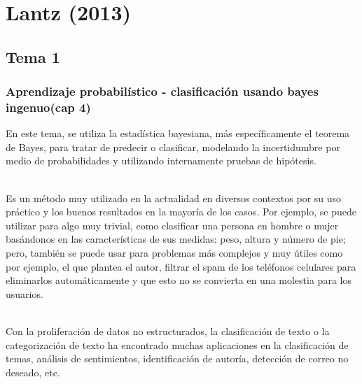 \documentclass[10pt]{beamer}
\begin{document}
\section{Lantz (2013)}
\subsection{Tema 1}
\begin{frame}
\frametitle{Aprendizaje probabilístico - clasificación usando bayes ingenuo(cap 4)}
En este tema, se utiliza la estadística bayesiana, más específicamente el teorema de Bayes, para tratar de predecir o clasificar, modelando la incertidumbre por medio de probabilidades y utilizando internamente pruebas de hipótesis. 

~\\Es un método muy utilizado en la actualidad en diversos contextos por su uso práctico y los buenos resultados en la mayoría de los casos. Por ejemplo, se puede utilizar para algo muy trivial, como clasificar una persona en hombre o mujer basándonos en las características de sus medidas: peso, altura y número de pie; pero, también se puede usar para problemas más complejos y muy útiles como por ejemplo, el que plantea el autor, filtrar el spam de los teléfonos celulares para eliminarlos automáticamente y que esto no se convierta en una molestia para los usuarios.

~\\Con la proliferación de datos no estructurados, la clasificación de texto o la categorización de texto ha encontrado muchas aplicaciones en la clasificación de temas, análisis de sentimientos, identificación de autoría, detección de correo no deseado, etc. 
\end{frame}
\end{document}
